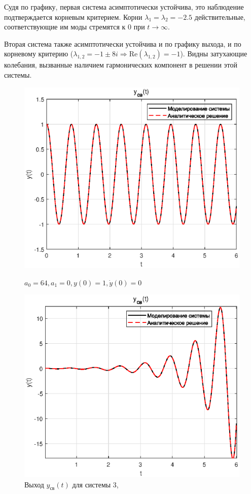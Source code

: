 \documentclass[a4paper]{article}
\begin{document}
Судя по графику, первая система асимптотически устойчива, это наблюдение подтверждается корневым критерием. Корни $\lambda_1 = \lambda_2 = -2.5$ действительные, соответствующие им моды стремятся к 0 при $t \to \infty$.\ 

Вторая система также асимптотически устойчива и по графику выхода, и по корневому критерию ($\lambda_{1,2} = -1\pm 8i \Rightarrow \text{Re}(\lambda_{1,2})=-1$). Видны затухающие колебания, вызванные наличием гармонических компонент в решении этой системы.

\begin{figure}[H]
    \begin{minipage}{0.5\textwidth}
        \centering \includegraphics[width=\textwidth]{ex1/3.eps}
        \caption{Выход $y_{\text{св}}(t)$ для системы 3,}
        \centerline{$a_0 = 64, a_1 = 0, y(0) = 1, \dot{y}(0) = 0$}
    \end{minipage}\hfill
    \begin{minipage}{0.5\textwidth}
        \centering \includegraphics[width=\textwidth]{ex1/4.eps}

\end{minipage}
\end{figure}
\end{document}
